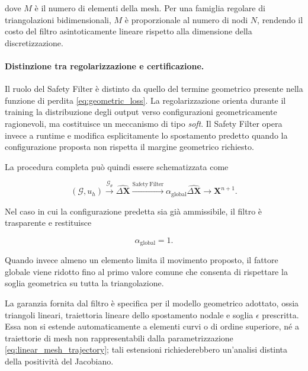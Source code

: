 dove $M$ è il numero di elementi della mesh. Per una famiglia regolare di triangolazioni bidimensionali, $M$ è proporzionale al numero di nodi $N$, rendendo il costo del filtro asintoticamente lineare rispetto alla dimensione della discretizzazione.

\paragraph{Distinzione tra regolarizzazione e certificazione.}

Il ruolo del Safety Filter è distinto da quello del termine geometrico presente nella funzione di perdita \eqref{eq:geometric_loss}. La regolarizzazione orienta durante il training la distribuzione degli output verso configurazioni geometricamente ragionevoli, ma costituisce un meccanismo di tipo \textit{soft}. Il Safety Filter opera invece a runtime e modifica esplicitamente lo spostamento predetto quando la configurazione proposta non rispetta il margine geometrico richiesto.

La procedura completa può quindi essere schematizzata come

\begin{equation}
(\mathcal{G},u_h)
\xrightarrow{\mathcal{G}_{\theta}}
\widehat{\Delta\mathbf{X}}
\xrightarrow{\mathrm{Safety\ Filter}}
\alpha_{\mathrm{global}}\widehat{\Delta\mathbf{X}}
\xrightarrow{}
\mathbf{X}^{n+1}.
\label{eq:gdm_pipeline}
\end{equation}

Nel caso in cui la configurazione predetta sia già ammissibile, il filtro è trasparente e restituisce

\[
\alpha_{\mathrm{global}}=1.
\]

Quando invece almeno un elemento limita il movimento proposto, il fattore globale viene ridotto fino al primo valore comune che consenta di rispettare la soglia geometrica su tutta la triangolazione.

La garanzia fornita dal filtro è specifica per il modello geometrico adottato, ossia triangoli lineari, traiettoria lineare dello spostamento nodale e soglia $\epsilon$ prescritta. Essa non si estende automaticamente a elementi curvi o di ordine superiore, né a traiettorie di mesh non rappresentabili dalla parametrizzazione \eqref{eq:linear_mesh_trajectory}; tali estensioni richiederebbero un'analisi distinta della positività del Jacobiano.
